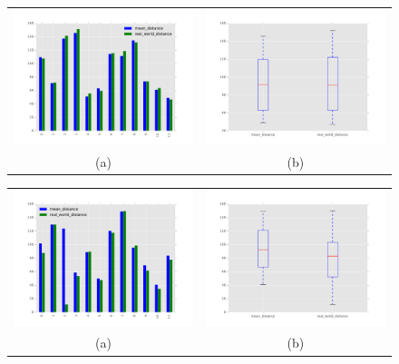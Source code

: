 	\begin{figure}[h]
		\centering
		\begin{tabular}{cc}
		\includegraphics[width=7cm]{img/evaluation/sample_medium_bar}&
		\includegraphics[width=7cm]{img/evaluation/sample_medium_box}\\
		 (a) & (b)
		\end{tabular}
		\caption{}
	    \label{fig:sample_eval_big}
	\end{figure}

	\begin{figure}[h]
		\centering
		\begin{tabular}{cc}
		\includegraphics[width=7cm]{img/evaluation/sample_tiny_bar}&
		\includegraphics[width=7cm]{img/evaluation/sample_tiny_box}\\
		 (a) & (b)
		\end{tabular}
		\caption{}
	    \label{fig:sample_eval_big}
	\end{figure}

